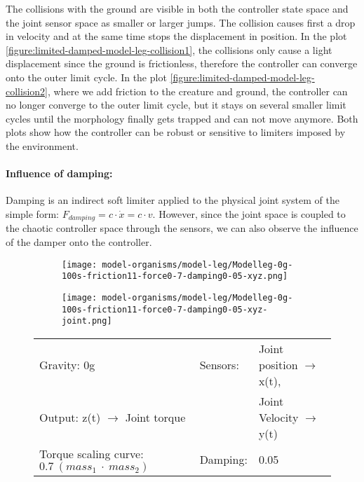 \documentclass[main]{subfiles}
\begin{document}
The collisions with the ground are visible in both the controller state space and the joint sensor space as smaller or larger jumps. The collision causes first a drop in velocity and at the same time stops the displacement in position. In the plot \ref{figure:limited-damped-model-leg-collision1}, the collisions only cause a light displacement since the ground is frictionless, therefore the controller can converge onto the outer limit cycle. In the plot \ref{figure:limited-damped-model-leg-collision2}, where we add friction to the creature and ground, the controller can no longer converge to the outer limit cycle, but it stays on several smaller limit cycles until the morphology finally gets trapped and can not move anymore. Both plots show how the controller can be robust or sensitive to limiters imposed by the environment.

\paragraph{Influence of damping:} Damping is an indirect soft limiter applied to the physical joint system of the simple form: \(F_{damping} = c \cdot \dot{x} = c \cdot v\). However, since the joint space is coupled to the chaotic controller space through the sensors, we can also observe the influence of the damper onto the controller.

\begin{figure}[H]
	\centering
		\begin{subfigure}[c]{0.45\textwidth}
	\texttt{[image: model-organisms/model-leg/Modelleg-0g-100s-friction11-force0-7-damping0-05-xyz.png]}
		\end{subfigure}
	\begin{subfigure}[c]{0.45\textwidth}
	\texttt{[image: model-organisms/model-leg/Modelleg-0g-100s-friction11-force0-7-damping0-05-xyz-joint.png]}
		\end{subfigure}
	\caption[Limited chaotic controller controlling model leg]{}
	\begin{tabular}{l|ll}
	\hline 
	Gravity: 0g  & Sensors: & Joint position \(\rightarrow\) x(t),\\
	 Output: z(t) \(\rightarrow\) Joint torque & & Joint Velocity \(\rightarrow\) y(t) \\
	  Torque scaling curve: \(0.7~(mass_1~\cdot~mass_2)\) & Damping: & 0.05 \\
	  \hline
	\end{tabular}

	\label{figure:limited-damped-model-leg-damping1}
\end{figure}
\end{document}
